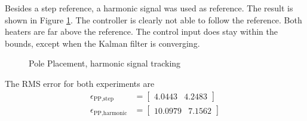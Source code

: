 Besides a step reference, a harmonic signal was used as reference. The result is shown in Figure \ref{fig:PPper}. The controller is clearly not able to follow the reference. Both heaters are far above the reference. The control input does stay within the bounds, except when the Kalman filter is converging.

\begin{figure}
    \centering
    
    \caption{Pole Placement, harmonic signal tracking}
    \label{fig:PPper}
\end{figure}
The RMS error for both experiments are
\begin{align*}
    \epsilon_{\text{PP,step}} &= \begin{bmatrix} 4.0443 & 4.2483\end{bmatrix}\\
    \epsilon_{\text{PP,harmonic}} &= \begin{bmatrix} 10.0979 & 7.1562 \end{bmatrix}    
\end{align*}


